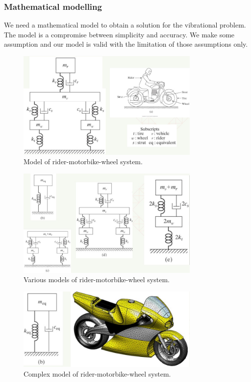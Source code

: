 \subsubsection{Mathematical modelling}
We need a mathematical model to obtain a solution for the vibrational problem. The model is a compromise between simplicity and accuracy. We make some assumption and our model is valid with the limitation of those assumptions only.
\begin{figure}[H]
    \centering
    \includegraphics[width = 0.8\textwidth]{./img/diagram7.jpg}
    \caption{Model of rider-motorbike-wheel system.}
\end{figure}
\begin{figure}[H]
    \centering
    \includegraphics[width = 0.8\textwidth]{./img/diagram8.jpg}
    \caption{Various models of rider-motorbike-wheel system.}
\end{figure}
\begin{figure}[H]
    \centering
    \includegraphics[width = 0.8\textwidth]{./img/diagram9.jpg}
    \caption{Complex model of rider-motorbike-wheel system.}
\end{figure}
